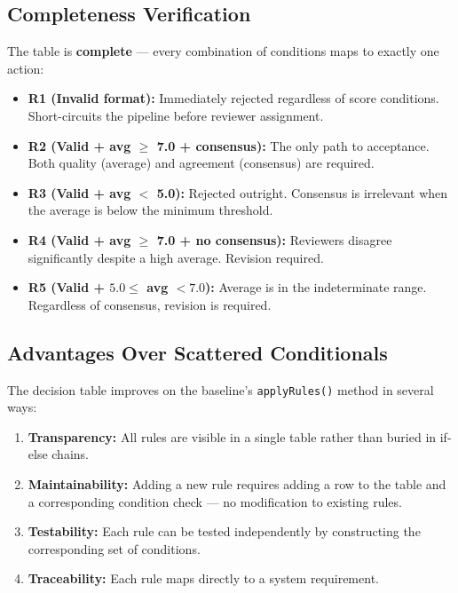 \documentclass[12pt, a4paper]{article}
\begin{document}
\subsection{Completeness Verification}

The table is \textbf{complete} --- every combination of conditions maps to exactly one action:

\begin{itemize}[nosep]
    \item \textbf{R1 (Invalid format):} Immediately rejected regardless of score conditions. Short-circuits the pipeline before reviewer assignment.
    \item \textbf{R2 (Valid + avg $\geq$ 7.0 + consensus):} The only path to acceptance. Both quality (average) and agreement (consensus) are required.
    \item \textbf{R3 (Valid + avg $<$ 5.0):} Rejected outright. Consensus is irrelevant when the average is below the minimum threshold.
    \item \textbf{R4 (Valid + avg $\geq$ 7.0 + no consensus):} Reviewers disagree significantly despite a high average. Revision required.
    \item \textbf{R5 (Valid + $5.0 \leq$ avg $< 7.0$):} Average is in the indeterminate range. Regardless of consensus, revision is required.
\end{itemize}

\subsection{Advantages Over Scattered Conditionals}

The decision table improves on the baseline's \texttt{applyRules()} method in several ways:

\begin{enumerate}[nosep]
    \item \textbf{Transparency:} All rules are visible in a single table rather than buried in if-else chains.
    \item \textbf{Maintainability:} Adding a new rule requires adding a row to the table and a corresponding condition check --- no modification to existing rules.
    \item \textbf{Testability:} Each rule can be tested independently by constructing the corresponding set of conditions.
    \item \textbf{Traceability:} Each rule maps directly to a system requirement.
\end{enumerate}
\end{document}
